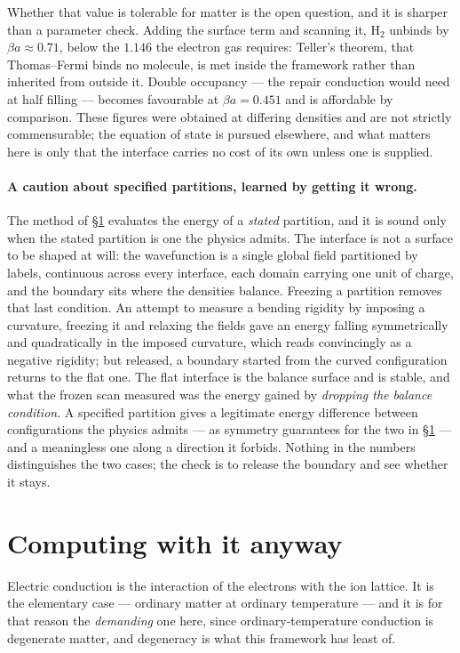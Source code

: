 \documentclass[11pt]{article}
\begin{document}
Whether that value is tolerable for matter is the open question, and it is sharper than a parameter
check. Adding the surface term and scanning it, $\mathrm{H}_2$ unbinds by $\beta a\approx0.71$,
below the $1.146$ the electron gas requires: Teller's theorem, that Thomas--Fermi binds no molecule,
is met inside the framework rather than inherited from outside it. Double occupancy --- the repair
conduction would need at half filling --- becomes favourable at $\beta a=0.451$ and is affordable by
comparison. These figures were obtained at differing densities and are not strictly commensurable;
the equation of state is pursued elsewhere, and what matters here is only that the interface
carries no cost of its own unless one is supplied.

\paragraph{A caution about specified partitions, learned by getting it wrong.} The method of
\S\ref{sec:conduction} evaluates the energy of a \emph{stated} partition, and it is sound only when
the stated partition is one the physics admits. The interface is not a surface to be shaped at
will: the wavefunction is a single global field partitioned by labels, continuous across every
interface, each domain carrying one unit of charge, and the boundary sits where the densities
balance. Freezing a partition removes that last condition. An attempt to measure a bending rigidity
by imposing a curvature, freezing it and relaxing the fields gave an energy falling symmetrically
and quadratically in the imposed curvature, which reads convincingly as a negative rigidity; but
released, a boundary started from the curved configuration returns to the flat one. The flat
interface is the balance surface and is stable, and what the frozen scan measured was the energy
gained by \emph{dropping the balance condition}. A specified partition gives a legitimate energy
difference between configurations the physics admits --- as symmetry guarantees for the two in
\S\ref{sec:conduction} --- and a meaningless one along a direction it forbids. Nothing in the
numbers distinguishes the two cases; the check is to release the boundary and see whether it stays.

\section{Computing with it anyway}\label{sec:conduction}

Electric conduction is the interaction of the electrons with the ion lattice. It is the elementary
case --- ordinary matter at ordinary temperature --- and it is for that reason the \emph{demanding}
one here, since ordinary-temperature conduction is degenerate matter, and degeneracy is what this
framework has least of.
\end{document}
